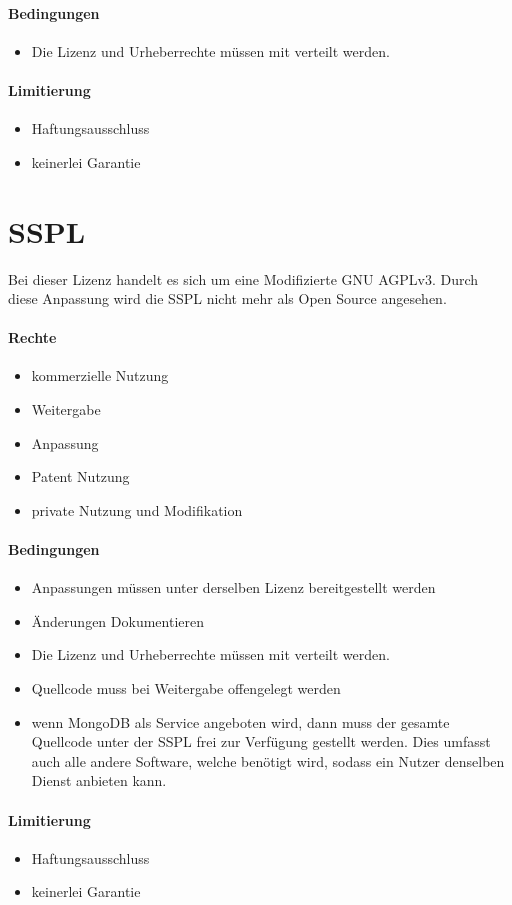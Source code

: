 \paragraph{Bedingungen}
\begin{itemize}
    \item Die Lizenz und Urheberrechte müssen mit verteilt werden.
\end{itemize}

\paragraph{Limitierung}
\begin{itemize}
    \item Haftungsausschluss
    \item keinerlei Garantie
\end{itemize}


\section{\acf{SSPL}}\label{sec:server-side-public-license}
Bei dieser Lizenz handelt es sich um eine Modifizierte GNU AGPLv3.
Durch diese Anpassung wird die \ac{SSPL} nicht mehr als Open Source angesehen.\cite{osi-sspl}

\paragraph{Rechte}
\begin{itemize}
    \item kommerzielle Nutzung
    \item Weitergabe
    \item Anpassung
    \item Patent Nutzung
    \item private Nutzung und Modifikation
\end{itemize}
\paragraph{Bedingungen}
\begin{itemize}
    \item Anpassungen müssen unter derselben Lizenz bereitgestellt werden
    \item Änderungen Dokumentieren
    \item Die Lizenz und Urheberrechte müssen mit verteilt werden.
    \item Quellcode muss bei Weitergabe offengelegt werden
    \item wenn MongoDB als Service angeboten wird, dann muss der gesamte Quellcode unter der
    \ac{SSPL} frei zur Verfügung gestellt werden.
    Dies umfasst auch alle andere Software, welche benötigt wird, sodass ein Nutzer denselben Dienst anbieten kann.
\end{itemize}

\paragraph{Limitierung}
\begin{itemize}
    \item Haftungsausschluss
    \item keinerlei Garantie
\end{itemize}